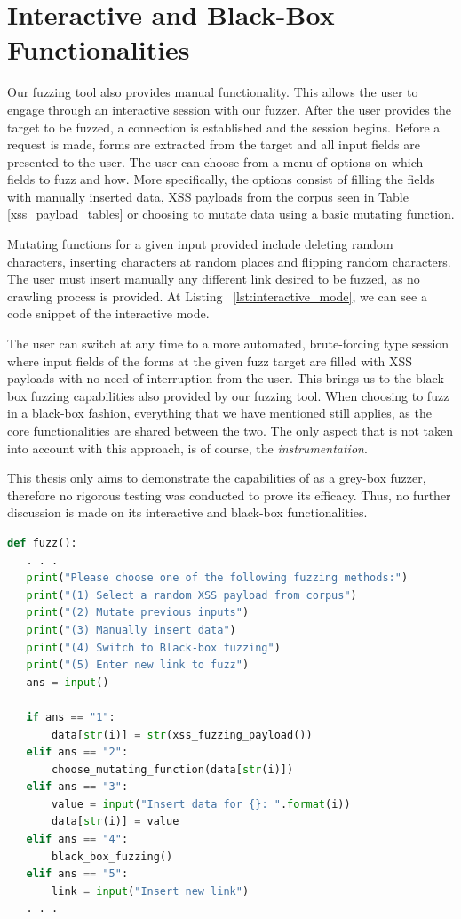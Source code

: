 \section{Interactive and Black-Box Functionalities}
Our fuzzing tool also provides manual functionality. This allows the user to engage through an interactive session with our fuzzer. After the user provides the target to be fuzzed, a connection is established and the session begins. Before a request is made, forms are extracted from the target and all input fields are presented to the user. The user can choose from a menu of options on which fields to fuzz and how. More specifically, the options consist of filling the fields with manually inserted data, XSS payloads from the corpus seen in Table \ref{xss_payload_tables} or choosing to mutate data using a basic mutating function. 

Mutating functions for a given input provided include deleting random characters, inserting characters at random places and flipping random characters. The user must insert manually any different link desired to be fuzzed, as no crawling process is provided. At Listing ~\ref{lst:interactive_mode}, we can see a code snippet of the interactive mode. 

The user can switch at any time to a more automated, brute-forcing type session where input fields of the forms at the given fuzz target are filled with XSS payloads with no need of interruption from the user. This brings us to the black-box fuzzing capabilities also provided by our fuzzing tool. When choosing to fuzz in a black-box fashion, everything that we have mentioned still applies, as the core functionalities are shared between the two. The only aspect that is not taken into account with this approach, is of course, the \emph{instrumentation}.

This thesis only aims to demonstrate the capabilities of \pname{} as a grey-box fuzzer, therefore no rigorous testing was conducted to prove its efficacy. Thus, no further discussion is made on its interactive and black-box functionalities.

\begin{lstlisting}[aboveskip=\baselineskip, showstringspaces=false, frame=single, language=Python, columns=flexible, keepspaces=true, caption={\textit{Options menu and their processing during interactive mode fuzzing}}, numberstyle=\color{gray}, numbersep=5pt, label={lst:interactive_mode}]
def fuzz():
   . . .
   print("Please choose one of the following fuzzing methods:")
   print("(1) Select a random XSS payload from corpus")
   print("(2) Mutate previous inputs")
   print("(3) Manually insert data")
   print("(4) Switch to Black-box fuzzing")
   print("(5) Enter new link to fuzz")
   ans = input()
   
   if ans == "1":
       data[str(i)] = str(xss_fuzzing_payload())
   elif ans == "2":
       choose_mutating_function(data[str(i)])
   elif ans == "3":
       value = input("Insert data for {}: ".format(i))
       data[str(i)] = value
   elif ans == "4":
       black_box_fuzzing()
   elif ans == "5":
       link = input("Insert new link")
   . . .
     
\end{lstlisting}

